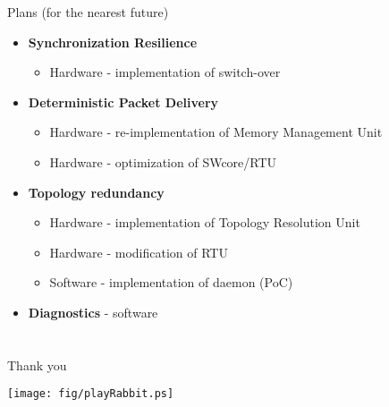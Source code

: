 \documentclass[compress,red]{beamer}
\begin{document}
\begin{frame}{Plans (for the nearest future)}

  \begin{itemize}
    \item {\bf Synchronization Resilience}
    \begin{itemize}
      \item Hardware - implementation of switch-over
    \end{itemize}    
    \item {\bf Deterministic Packet Delivery}
    \begin{itemize}
      \item Hardware - re-implementation of Memory Management Unit
      \item Hardware - optimization of SWcore/RTU 
    \end{itemize}    
    \item {\bf Topology redundancy}
    \begin{itemize}
      \item Hardware - implementation of Topology Resolution Unit
      \item Hardware - modification of RTU 
      \item Software - implementation of daemon (PoC)
    \end{itemize}  
    \item {\bf Diagnostics} - software
  \end{itemize}
\end{frame}
\section{}
\subsection{}
\begin{frame}{Thank you}


    
    \begin{center}
    \texttt{[image: fig/playRabbit.ps]}
    \end{center}

\end{frame}
\end{document}
